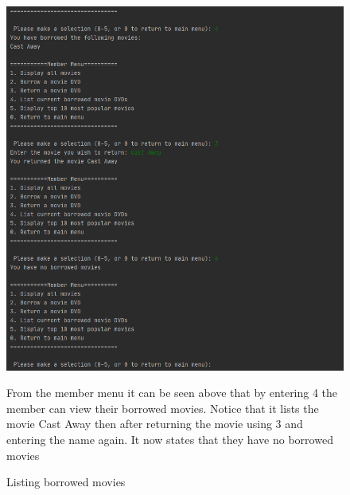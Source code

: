 \documentclass[a4paper,12pt]{article}
\begin{document}
\begin{figure}[!htb]
\centering
\includegraphics[width=1\textwidth]{10}
\caption{Listing borrowed movies}
\medskip
\small
From the member menu it can be seen above that by entering 4 the member can view their borrowed movies. Notice that it lists the movie Cast Away then after returning the movie using 3 and entering the name again. It now states that they have no borrowed movies 
\end{figure}
\end{document}

